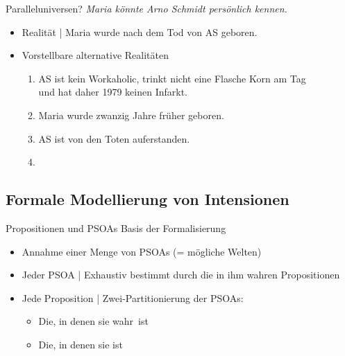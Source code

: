 \begin{frame}
  {Paralleluniversen?}
  \onslide<+->
  \onslide<+->
  \alert{\textit{Maria könnte Arno Schmidt persönlich kennen.}}\\
  \Zeile
  \begin{itemize}[<+->]
    \item Realität | Maria wurde nach dem Tod von AS geboren.
      \Halbzeile
    \item Vorstellbare alternative Realitäten
      \begin{enumerate}[<+->]
        \item AS ist kein Workaholic, trinkt nicht eine Flasche Korn am Tag\\
          und hat daher 1979 keinen Infarkt.
        \item Maria wurde zwanzig Jahre früher geboren.
        \item AS ist von den Toten auferstanden.
        \item {}
      \end{enumerate}
  \end{itemize}
\end{frame}

\subsection{Formale Modellierung von Intensionen}

\begin{frame}
  {Propositionen und PSOAs}
  \onslide<+->
  \onslide<+->
  Basis der Formalisierung\\
  \Halbzeile
  \begin{itemize}[<+->]
    \item Annahme einer \alert{Menge von PSOAs} (= mögliche Welten)
      \Halbzeile
    \item Jeder PSOA | Exhaustiv bestimmt durch die in ihm wahren Propositionen
      \Halbzeile
    \item Jede Proposition | Zwei-Partitionierung der PSOAs:
      \begin{itemize}[<+->]
        \item Die, in denen sie \alert{wahr} ist
        \item Die, in denen sie  ist
      \end{itemize}
  \end{itemize}
\end{frame}

